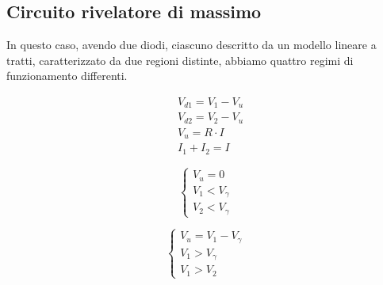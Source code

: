 \documentclass[../elettronica]{subfiles}
\begin{document}
\subsection{Circuito rivelatore di massimo}
\begin{figure}[h]
    \centering
\end{figure}

In questo caso, avendo due diodi, ciascuno descritto da un modello lineare a tratti, caratterizzato da due regioni
distinte, abbiamo quattro regimi di funzionamento differenti.
\begin{tcolorbox}[title=Relazioni fondamentali]
    \begin{align*}
        &V_{d1} = V_1 - V_u
        \\
        &V_{d2} = V_2 - V_u
        \\
        &V_u = R \cdot I
        \\
        &I_1 + I_2 = I
    \end{align*}
\end{tcolorbox}

\begin{minipage}[b]{.45\textwidth}
    \begin{tcolorbox}[title=D1 e D2 OFF]
        \[\begin{cases}
            V_u = 0
            \\
            V_{1} < V_\gamma
            \\
            V_{2} < V_\gamma
        \end{cases}\]
    \end{tcolorbox}
\end{minipage}
\begin{minipage}[b]{.45\textwidth}
    \begin{tcolorbox}[title=D1 ON e D2 OFF]
        \[\begin{cases}
            V_u = V_{1} - V_\gamma
            \\
            V_{1} > V_\gamma
            \\
            V_{1} > V_{2}
        \end{cases}\]
    \end{tcolorbox}
\end{minipage}
\end{document}
